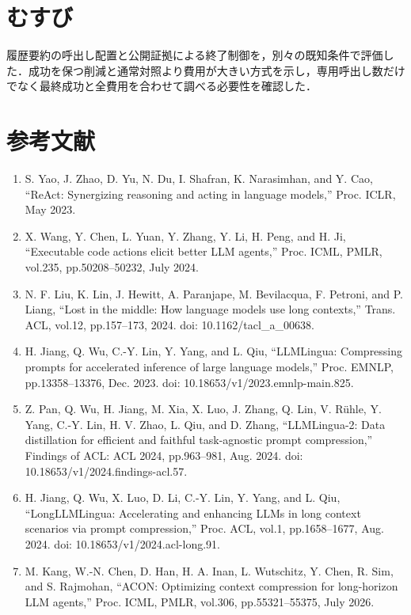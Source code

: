 \documentclass{article}
\begin{document}
\section{むすび}
履歴要約の呼出し配置と公開証拠による終了制御を，別々の既知条件で評価した．成功を保つ削減と通常対照より費用が大きい方式を示し，専用呼出し数だけでなく最終成功と全費用を合わせて調べる必要性を確認した．

\section*{参考文献}
\begin{enumerate}
\item S. Yao, J. Zhao, D. Yu, N. Du, I. Shafran, K. Narasimhan, and Y. Cao,
``ReAct: Synergizing reasoning and acting in language models,''
Proc. ICLR, May 2023.

\item X. Wang, Y. Chen, L. Yuan, Y. Zhang, Y. Li, H. Peng, and H. Ji,
``Executable code actions elicit better LLM agents,''
Proc. ICML, PMLR, vol.235, pp.50208--50232, July 2024.

\item N. F. Liu, K. Lin, J. Hewitt, A. Paranjape, M. Bevilacqua, F. Petroni, and P. Liang,
``Lost in the middle: How language models use long contexts,''
Trans. ACL, vol.12, pp.157--173, 2024.
doi: 10.1162/tacl\_a\_00638.

\item H. Jiang, Q. Wu, C.-Y. Lin, Y. Yang, and L. Qiu,
``LLMLingua: Compressing prompts for accelerated inference of large language models,''
Proc. EMNLP, pp.13358--13376, Dec. 2023.
doi: 10.18653/v1/2023.emnlp-main.825.

\item Z. Pan, Q. Wu, H. Jiang, M. Xia, X. Luo, J. Zhang, Q. Lin, V. R\"uhle,
Y. Yang, C.-Y. Lin, H. V. Zhao, L. Qiu, and D. Zhang,
``LLMLingua-2: Data distillation for efficient and faithful task-agnostic prompt compression,''
Findings of ACL: ACL 2024, pp.963--981, Aug. 2024.
doi: 10.18653/v1/2024.findings-acl.57.

\item H. Jiang, Q. Wu, X. Luo, D. Li, C.-Y. Lin, Y. Yang, and L. Qiu,
``LongLLMLingua: Accelerating and enhancing LLMs in long context scenarios via prompt compression,''
Proc. ACL, vol.1, pp.1658--1677, Aug. 2024.
doi: 10.18653/v1/2024.acl-long.91.

\item M. Kang, W.-N. Chen, D. Han, H. A. Inan, L. Wutschitz, Y. Chen,
R. Sim, and S. Rajmohan,
``ACON: Optimizing context compression for long-horizon LLM agents,''
Proc. ICML, PMLR, vol.306, pp.55321--55375, July 2026.


\end{enumerate}
\end{document}
